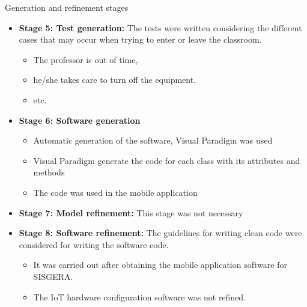 \documentclass[notes=show, 10pt, xcolor=table]{beamer}
\begin{document}
    \begin{frame}{Generation and refinement stages}
        \begin{itemize}
        	\item \textbf{Stage 5: Test generation:} The tests were written considering the different cases that may occur when trying to enter or leave the classroom.
        	\begin{itemize}
        		\item The professor is out of time,
        		\item he/she takes care to turn off the equipment,
        		\item etc.
            \end{itemize}
        	\item \textbf{Stage 6: Software generation}
    		\begin{itemize}
    			\item Automatic generation of the software, Visual Paradigm was used
    			\item Visual Paradigm generate the code for each class with its attributes and methods
    			\item The code was used in the mobile application
    		\end{itemize}
    		\item \textbf{Stage 7: Model refinement:} This stage was not necessary
    		\item \textbf{Stage 8: Software refinement:} The guidelines for writing clean code were considered for writing the software code.
    		\begin{itemize}
    			\item It was carried out after obtaining the mobile application software for SISGERA.
    			\item The IoT hardware configuration software was not refined.
    		\end{itemize}
    	\end{itemize}
        

\end{frame}
\end{document}
